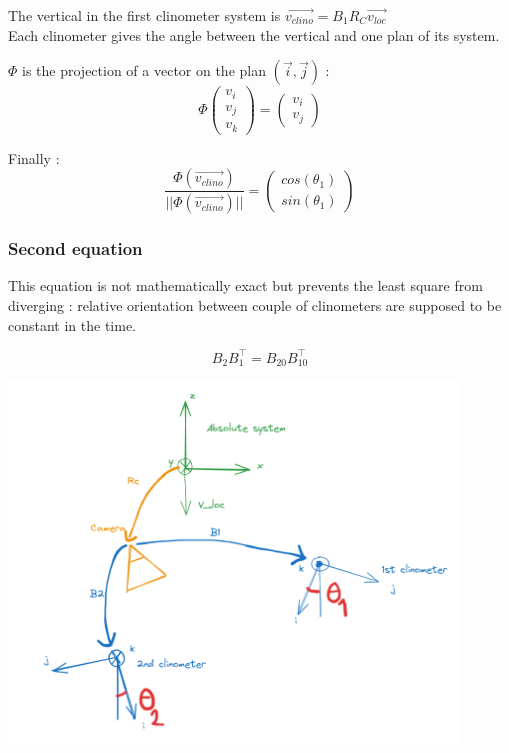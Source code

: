 The vertical in the first clinometer system is $\Vec{v_{clino}} = B_1 R_C \Vec{v_{loc}} $\\

Each clinometer gives the angle between the vertical and one plan of its system.

$\Phi$ is the projection of a vector on the plan $(\Vec{i}, \Vec{j})$ :
\begin{equation}
     \Phi \begin{pmatrix}
          v_i \\
          v_j \\
          v_k
     \end{pmatrix} = \begin{pmatrix}
          v_i \\
          v_j
     \end{pmatrix}
\end{equation}


Finally :
\begin{equation}
     \frac{\Phi (\Vec{v_{clino}})}{|| \Phi (\Vec{v_{clino}}) ||}   = \begin{pmatrix}
          cos(\theta_1) \\
          sin(\theta_1)
     \end{pmatrix}
\end{equation}


\subsubsection{Second equation}

\label{SecondClinoCalibEq}

This equation is not mathematically exact but prevents the least square from diverging : relative orientation between couple of clinometers are supposed to be constant in the time.

\begin{equation}
     B_2 B_1^\intercal = B_{20} B_{10}^\intercal
\end{equation}

\includegraphics[width=12cm]{Programmer/ClinoBA.png}


